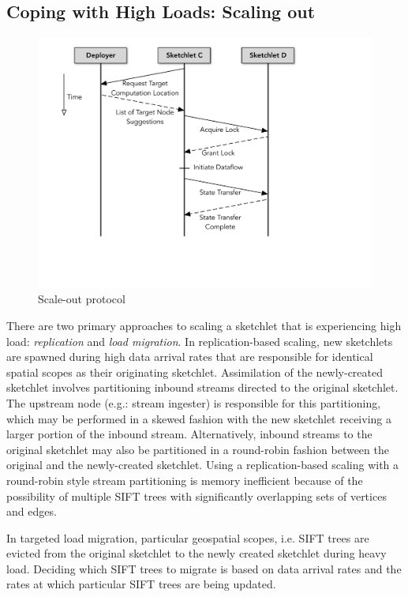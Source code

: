 \subsection{Coping with High Loads: Scaling out}
\label{subsec:scaling-out}
%
\begin{figure}[h!]
    \centering
    \includegraphics[scale=0.4, valign=t]{figures/scale-out.pdf}
    \caption{Scale-out protocol}
    \label{fig:scale-out-protocol}    
\end{figure}
There are two primary approaches to scaling a sketchlet that is experiencing high load: \emph{replication} and \emph{load migration}. In replication-based scaling, new sketchlets are spawned during high data arrival rates that are responsible for identical spatial scopes as their originating sketchlet. Assimilation of the newly-created sketchlet involves partitioning inbound streams directed to the original sketchlet. The upstream node (e.g.: stream ingester) is responsible for this partitioning, which may be performed in a skewed fashion with the new sketchlet receiving a larger portion of the inbound stream. Alternatively, inbound streams to the original sketchlet may also be partitioned in a round-robin fashion between the original and the newly-created sketchlet.
Using a replication-based scaling with a round-robin style stream partitioning is memory inefficient because of the possibility of multiple SIFT trees with significantly overlapping sets of vertices and edges.

In targeted load migration, particular geospatial scopes, i.e. SIFT trees are evicted from the original sketchlet to the newly created sketchlet during heavy load. Deciding which SIFT trees to migrate is based on data arrival rates and the rates at which particular SIFT trees are being updated.

